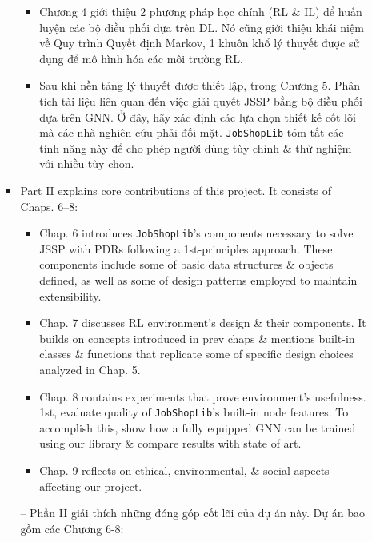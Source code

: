 \documentclass{article}
\begin{document}
\begin{itemize}
\begin{itemize}
\begin{itemize}
\begin{itemize}
                \item Chương 4 giới thiệu 2 phương pháp học chính (RL \& IL) để huấn luyện các bộ điều phối dựa trên DL. Nó cũng giới thiệu khái niệm về Quy trình Quyết định Markov, 1 khuôn khổ lý thuyết được sử dụng để mô hình hóa các môi trường RL.
                \item Sau khi nền tảng lý thuyết được thiết lập, trong Chương 5. Phân tích tài liệu liên quan đến việc giải quyết JSSP bằng bộ điều phối dựa trên GNN. Ở đây, hãy xác định các lựa chọn thiết kế cốt lõi mà các nhà nghiên cứu phải đối mặt. {\tt JobShopLib} tóm tắt các tính năng này để cho phép người dùng tùy chỉnh \& thử nghiệm với nhiều tùy chọn.
            \end{itemize}
            \item Part II explains core contributions of this project. It consists of Chaps. 6--8:
            \begin{itemize}
                \item Chap. 6 introduces {\tt JobShopLib}'s components necessary to solve JSSP with PDRs following a 1st-principles approach. These components include some of basic data structures \& objects defined, as well as some of design patterns employed to maintain extensibility.
                \item Chap. 7 discusses RL environment's design \& their components. It builds on concepts introduced in prev chaps \& mentions built-in classes \& functions that replicate some of specific design choices analyzed in Chap. 5.
                \item Chap. 8 contains experiments that prove environment's usefulness. 1st, evaluate quality of {\tt JobShopLib}'s built-in node features. To accomplish this, show how a fully equipped GNN can be trained using our library \& compare results with state of art.
                \item Chap. 9 reflects on ethical, environmental, \& social aspects affecting our project.
            \end{itemize}
            -- Phần II giải thích những đóng góp cốt lõi của dự án này. Dự án bao gồm các Chương 6-8:


\end{itemize}
\end{itemize}
\end{itemize}
\end{document}
